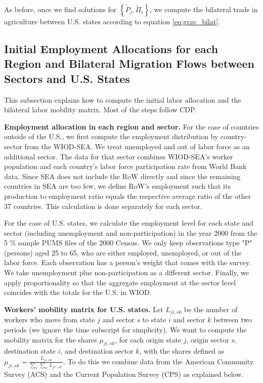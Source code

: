 \documentclass[12pt]{article}
\begin{document}
As before, once we find solutions for  $\left\{ \tilde{P}_{j}, \tilde{\Pi}_{i} \right\}$, we compute the  bilateral trade in agriculture between U.S. states according to equation \eqref{eq:grav_bilat}.

\subsection{Initial Employment Allocations for each Region and Bilateral Migration Flows between Sectors and U.S. States}\label{sec:appendix_data_migration}

This subsection explains how to compute the initial labor allocation and the bilateral labor mobility matrix. Most of the steps follow CDP. 

\textbf{Employment allocation in each region and sector.} For the case of countries outside of the U.S., we first compute the employment distribution by country-sector from the WIOD-SEA. We treat unemployed and out of labor force as an additional sector. The data for that sector combines WIOD-SEA's worker population and each country's labor force participation rate from World Bank data. Since SEA does not include the RoW directly and since the remaining countries in SEA are too few, we define RoW's employment such that its production to employment ratio equals the respective average ratio of the other 37 countries. This calculation is done separately for each sector. 

For the case of U.S. states, we calculate the employment level for each state and sector (including unemployment and non-participation) in the year 2000 from the 5 \% sample PUMS files of the 2000 Census. We only keep observations type "P" (persons) aged 25 to 65, who are either employed, unemployed, or out of the labor force. Each observation has a person's weight that comes with the survey. We take unemployment plus non-participation as a different sector. Finally, we apply proportionality so that the aggregate employment at the sector level coincides with the totals for the U.S. in WIOD. 

\textbf{Workers' mobility matrix for U.S. states.} Let \(L_{ji,sk}\) be the number of workers who move from state $j$
and sector $s$ to state $i$ and sector $k$ between two periods (we ignore the time subscript for simplicity). We want to compute the mobility matrix for the shares  \(\mu_{ji,sk}\), for each origin state \(j\), origin sector \(s\), destination state \(i\), and destination sector \(k\), with the shares defined as  \(\mu_{ji,sk}=\frac{L_{ji,sk}}{\sum_{i'}\sum_{k'}L_{ji',sk'}}\).
To do this we combine data from the American Community Survey (ACS) and the Current Population Survey (CPS) as explained below. 
\end{document}
